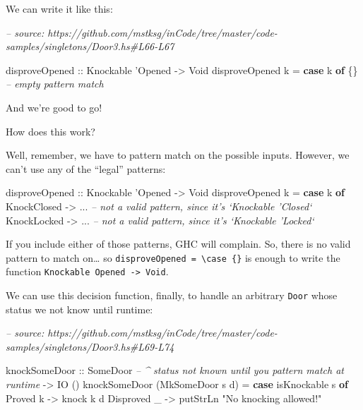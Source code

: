 \documentclass[]{article}
\newenvironment{Shaded}{}{}
\newcommand{\CommentTok}[1]{\textcolor[rgb]{0.38,0.63,0.69}{\textit{#1}}}
\newcommand{\DataTypeTok}[1]{\textcolor[rgb]{0.56,0.13,0.00}{#1}}
\newcommand{\FunctionTok}[1]{\textcolor[rgb]{0.02,0.16,0.49}{#1}}
\newcommand{\KeywordTok}[1]{\textcolor[rgb]{0.00,0.44,0.13}{\textbf{#1}}}
\newcommand{\NormalTok}[1]{#1}
\newcommand{\OtherTok}[1]{\textcolor[rgb]{0.00,0.44,0.13}{#1}}
\newcommand{\StringTok}[1]{\textcolor[rgb]{0.25,0.44,0.63}{#1}}
\begin{document}
We can write it like this:

\begin{Shaded}
\begin{Highlighting}[]
\CommentTok{-- source: https://github.com/mstksg/inCode/tree/master/code-samples/singletons/Door3.hs#L66-L67}

\OtherTok{disproveOpened ::} \DataTypeTok{Knockable}\NormalTok{ '}\DataTypeTok{Opened} \OtherTok{->} \DataTypeTok{Void}
\NormalTok{disproveOpened k }\FunctionTok{=} \KeywordTok{case}\NormalTok{ k }\KeywordTok{of}\NormalTok{ \{\}             }\CommentTok{-- empty pattern match}
\end{Highlighting}
\end{Shaded}

And we're good to go!

How does this work?

Well, remember, we have to pattern match on the possible inputs. However, we
can't use any of the ``legal'' patterns:

\begin{Shaded}
\begin{Highlighting}[]
\OtherTok{disproveOpened ::} \DataTypeTok{Knockable}\NormalTok{ '}\DataTypeTok{Opened} \OtherTok{->} \DataTypeTok{Void}
\NormalTok{disproveOpened k }\FunctionTok{=} \KeywordTok{case}\NormalTok{ k }\KeywordTok{of}
    \DataTypeTok{KnockClosed} \OtherTok{->} \FunctionTok{...}    \CommentTok{-- not a valid pattern, since it's `Knockable 'Closed`}
    \DataTypeTok{KnockLocked} \OtherTok{->} \FunctionTok{...}    \CommentTok{-- not a valid pattern, since it's `Knockable 'Locked`}
\end{Highlighting}
\end{Shaded}

If you include either of those patterns, GHC will complain. So, there is no
valid pattern to match on\ldots{} so
\texttt{disproveOpened\ =\ \textbackslash{}case\ \{\}} is enough to write the
function \texttt{Knockable\ \textquotesingle{}Opened\ -\textgreater{}\ Void}.

We can use this decision function, finally, to handle an arbitrary \texttt{Door}
whose status we not know until runtime:

\begin{Shaded}
\begin{Highlighting}[]
\CommentTok{-- source: https://github.com/mstksg/inCode/tree/master/code-samples/singletons/Door3.hs#L69-L74}

\NormalTok{knockSomeDoor}
\OtherTok{    ::} \DataTypeTok{SomeDoor}     \CommentTok{-- ^ status not known until you pattern match at runtime}
    \OtherTok{->} \DataTypeTok{IO}\NormalTok{ ()}
\NormalTok{knockSomeDoor (}\DataTypeTok{MkSomeDoor}\NormalTok{ s d) }\FunctionTok{=} \KeywordTok{case}\NormalTok{ isKnockable s }\KeywordTok{of}
    \DataTypeTok{Proved}\NormalTok{ k    }\OtherTok{->}\NormalTok{ knock k d}
    \DataTypeTok{Disproved}\NormalTok{ _ }\OtherTok{->}\NormalTok{ putStrLn }\StringTok{"No knocking allowed!"}
\end{Highlighting}
\end{Shaded}
\end{document}
